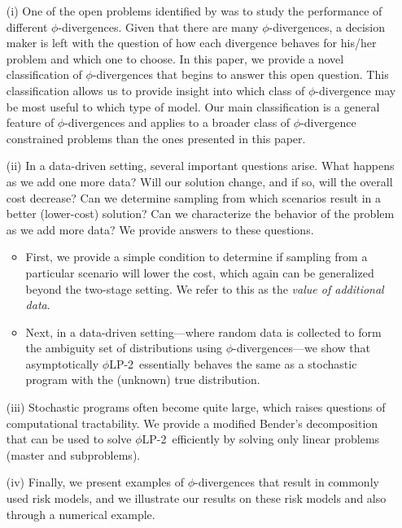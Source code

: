 \documentclass[opre,nonblindrev]{informs3} %
\newcommand{\plp}{$\phi$LP-2}
\begin{document}
\begin{itemize}
\item[(i)] One of the open problems identified by \citet{bental2013robust} was to study the performance of different $\phi$-divergences.
Given that there are many $\phi$-divergences, a decision maker is left with the question of how each divergence behaves for his/her problem and which one to choose.
In this paper, we provide a novel classification of $\phi$-divergences that begins to answer this open question.
This classification allows us to provide insight into which class of $\phi$-divergence may be most useful to which type of model.
		Our main classification is a general feature of $\phi$-divergences and applies to a broader class of $\phi$-divergence constrained problems than the ones presented in this paper. 

\item[(ii)] In a data-driven setting, several important questions arise.
		What happens as we add one more data?
		Will our solution change, and if so, will the overall cost decrease?
		Can we determine sampling from which scenarios result in a better (lower-cost) solution?
		Can we characterize the behavior of the problem as we add more data?
		We provide answers to these questions.

		\begin{itemize}
			\item First, we provide a simple condition to determine if sampling from a particular scenario will lower the cost, which again can be generalized beyond the two-stage setting.
		We refer to this as the {\it value of additional data}. 
			\item Next, in a data-driven setting---where random data is collected to form the ambiguity set of distributions using $\phi$-divergences---we show that asymptotically \plp\ essentially behaves  the same as a stochastic program with the (unknown) true distribution.
		\end{itemize}


\item[(iii)] Stochastic programs often become quite large, which raises questions of computational tractability.
		We provide a modified Bender's decomposition that can be used to solve \plp\ efficiently by solving only linear problems (master and subproblems). 

\item[(iv)]   Finally, we present examples of $\phi$-divergences that result in commonly used risk models, and we illustrate our results on these risk models and also through a numerical example. 
\end{itemize}
\end{document}
